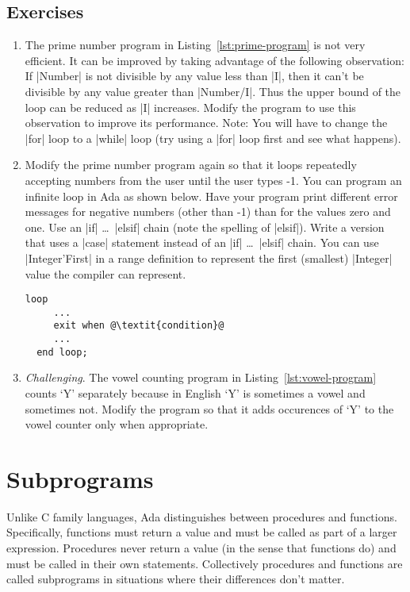 \subsection*{Exercises}

\begin{enumerate}
\item The prime number program in Listing~\ref{lst:prime-program} is not very efficient. It can
  be improved by taking advantage of the following observation: If |Number| is not divisible by
  any value less than |I|, then it can't be divisible by any value greater than |Number/I|. Thus
  the upper bound of the loop can be reduced as |I| increases. Modify the program to use this
  observation to improve its performance. Note: You will have to change the |for| loop to a
  |while| loop (try using a |for| loop first and see what happens).

\item Modify the prime number program again so that it loops repeatedly accepting numbers from
  the user until the user types -1. You can program an infinite loop in Ada as shown below. Have
  your program print different error messages for negative numbers (other than -1) than for the
  values zero and one. Use an |if| \ldots\ |elsif| chain (note the spelling of |elsif|). Write a
  version that uses a |case| statement instead of an |if| \ldots\ |elsif| chain. You can use
  |Integer'First| in a range definition to represent the first (smallest) |Integer| value the
  compiler can represent.

  \begin{lstlisting}[escapechar=\@]
  loop
     ...
     exit when @\textit{condition}@
     ...
  end loop;
  \end{lstlisting}

\item \textit{Challenging}. The vowel counting program in Listing~\ref{lst:vowel-program} counts
  `Y' separately because in English `Y' is sometimes a vowel and sometimes not. Modify the
  program so that it adds occurences of `Y' to the vowel counter only when appropriate.
\end{enumerate}

\section{Subprograms}

Unlike C family languages, Ada distinguishes between procedures and functions. Specifically,
functions must return a value and must be called as part of a larger expression. Procedures
never return a value (in the sense that functions do) and must be called in their own
statements. Collectively procedures and functions are called subprograms in situations where
their differences don't matter.

